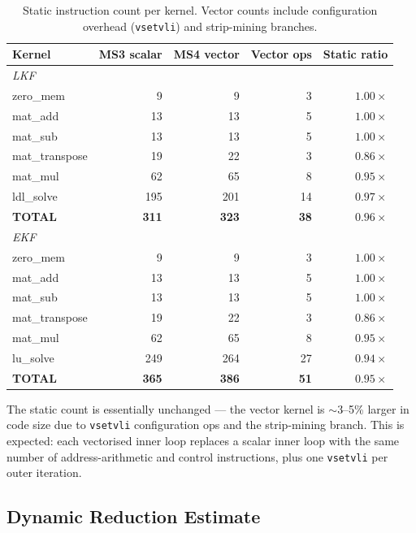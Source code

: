 \documentclass[11pt,a4paper]{article}
\begin{document}
\begin{table}[h]
\centering
\caption{Static instruction count per kernel. Vector counts include
configuration overhead (\texttt{vsetvli}) and strip-mining branches.}
\begin{tabular}{lrrrr}
\toprule
Kernel        & MS3 scalar & MS4 vector  & Vector ops & Static ratio \\
\midrule
\multicolumn{5}{l}{\textit{LKF}} \\
\midrule
zero\_mem        & 9   & 9    & 3  & $1.00\times$ \\
mat\_add         & 13  & 13   & 5  & $1.00\times$ \\
mat\_sub         & 13  & 13   & 5  & $1.00\times$ \\
mat\_transpose   & 19  & 22   & 3  & $0.86\times$ \\
mat\_mul         & 62  & 65   & 8  & $0.95\times$ \\
ldl\_solve       & 195 & 201  & 14 & $0.97\times$ \\
\textbf{TOTAL}   & \textbf{311} & \textbf{323} & \textbf{38} & $\mathbf{0.96\times}$ \\
\midrule
\multicolumn{5}{l}{\textit{EKF}} \\
\midrule
zero\_mem        & 9   & 9    & 3  & $1.00\times$ \\
mat\_add         & 13  & 13   & 5  & $1.00\times$ \\
mat\_sub         & 13  & 13   & 5  & $1.00\times$ \\
mat\_transpose   & 19  & 22   & 3  & $0.86\times$ \\
mat\_mul         & 62  & 65   & 8  & $0.95\times$ \\
lu\_solve        & 249 & 264  & 27 & $0.94\times$ \\
\textbf{TOTAL}   & \textbf{365} & \textbf{386} & \textbf{51} & $\mathbf{0.95\times}$ \\
\bottomrule
\end{tabular}
\end{table}

The static count is essentially unchanged --- the vector kernel is
$\sim$3--5\% larger in code size due to \texttt{vsetvli} configuration
ops and the strip-mining branch. This is expected: each vectorised inner
loop replaces a scalar inner loop with the same number of address-arithmetic
and control instructions, plus one \texttt{vsetvli} per outer iteration.

\subsection{Dynamic Reduction Estimate}
\end{document}
